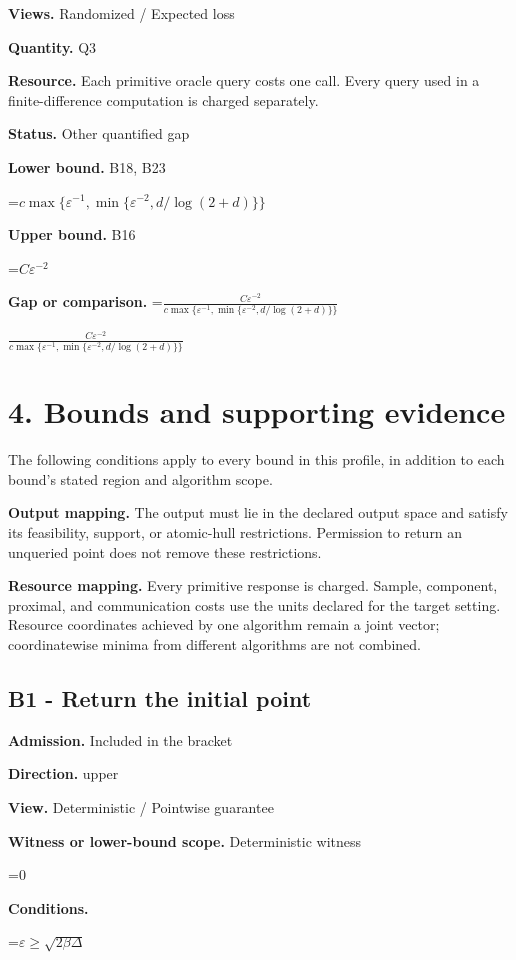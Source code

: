 \documentclass[10pt,a4paper]{article}
\newcommand{\AtlasMath}[1]{\par\begingroup\centering\setbox0=\hbox{$\displaystyle #1$}\ifdim\wd0>1.4\linewidth\typeout{ATLAS WIDE FORMULA: \the\wd0}\fi\ifdim\wd0>\linewidth\resizebox{\linewidth}{!}{\box0}\else\box0\fi\par\endgroup}
\newcommand{\AtlasInlineMath}[1]{\begingroup\setbox0=\hbox{$#1$}\ifdim\wd0>.4\linewidth\endgroup\AtlasMath{#1}\else\endgroup$#1$\fi}
\begin{document}
\textbf{Views.} Randomized / Expected loss

\textbf{Quantity.} Q3

\textbf{Resource.} Each primitive oracle query costs one call. Every query used in a finite-difference computation is charged separately.

\textbf{Status.} Other quantified gap

\textbf{Lower bound.} B18, B23

\AtlasMath{c\max\{\varepsilon^{-1},\min\{\varepsilon^{-2},d/\log(2+d)\}\}}
\textbf{Upper bound.} B16

\AtlasMath{C\varepsilon^{-2}}
\textbf{Gap or comparison.} \AtlasInlineMath{\frac{C\varepsilon^{-2}}{c\max\{\varepsilon^{-1},\min\{\varepsilon^{-2},d/\log(2+d)\}\}}}

\section{4. Bounds and supporting evidence}
The following conditions apply to every bound in this profile, in addition to each bound's stated region and algorithm scope.

\textbf{Output mapping.} The output must lie in the declared output space and satisfy its feasibility, support, or atomic-hull restrictions. Permission to return an unqueried point does not remove these restrictions.

\textbf{Resource mapping.} Every primitive response is charged. Sample, component, proximal, and communication costs use the units declared for the target setting. Resource coordinates achieved by one algorithm remain a joint vector; coordinatewise minima from different algorithms are not combined.

\subsection{B1 - Return the initial point}
\textbf{Admission.} Included in the bracket

\textbf{Direction.} upper

\textbf{View.} Deterministic / Pointwise guarantee

\textbf{Witness or lower-bound scope.} Deterministic witness

\AtlasMath{0}
\textbf{Conditions.} 


\AtlasMath{\varepsilon\ge\sqrt{2\beta\Delta}}
\end{document}

